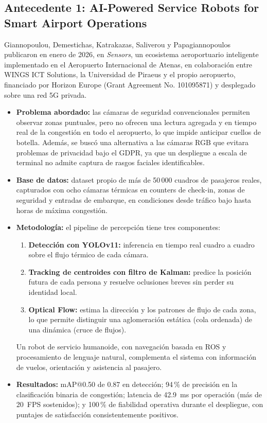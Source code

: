 \documentclass[12pt,letterpaper]{article}
\begin{document}
\subsection{Antecedente 1: AI-Powered Service Robots for Smart Airport Operations~\cite{giannopoulou2026}}

Giannopoulou, Demestichas, Katrakazas, Saliverou y Papagiannopoulos
publicaron en enero de 2026, en \textit{Sensors}, un ecosistema
aeroportuario inteligente implementado en el Aeropuerto Internacional de
Atenas, en colaboración entre WINGS ICT Solutions, la Universidad de
Piraeus y el propio aeropuerto, financiado por Horizon Europe (Grant
Agreement No. 101095871) y desplegado sobre una red 5G privada.

\begin{itemize}
    \item \textbf{Problema abordado:} las cámaras de seguridad
    convencionales permiten observar zonas puntuales, pero no ofrecen una
    lectura agregada y en tiempo real de la congestión en todo el
    aeropuerto, lo que impide anticipar cuellos de botella. Además, se
    buscó una alternativa a las cámaras RGB que evitara problemas de
    privacidad bajo el GDPR, ya que un despliegue a escala de terminal no
    admite captura de rasgos faciales identificables.

    \item \textbf{Base de datos:} dataset propio de más de 50\,000
    cuadros de pasajeros reales, capturados con ocho cámaras térmicas en
    counters de check-in, zonas de seguridad y entradas de embarque, en
    condiciones desde tráfico bajo hasta horas de máxima congestión.

    \item \textbf{Metodología:} el pipeline de percepción tiene tres
    componentes:
    \begin{enumerate}
        \item \textbf{Detección con YOLOv11:} inferencia en tiempo real
        cuadro a cuadro sobre el flujo térmico de cada cámara.
        \item \textbf{Tracking de centroides con filtro de Kalman:}
        predice la posición futura de cada persona y resuelve oclusiones
        breves sin perder su identidad local.
        \item \textbf{Optical Flow:} estima la dirección y los patrones de
        flujo de cada zona, lo que permite distinguir una aglomeración
        estática (cola ordenada) de una dinámica (cruce de flujos).
    \end{enumerate}
    Un robot de servicio humanoide, con navegación basada en ROS y
    procesamiento de lenguaje natural, complementa el sistema con
    información de vuelos, orientación y asistencia al pasajero.

    \item \textbf{Resultados:} mAP@0.50 de 0.87 en detección; 94\,\% de
    precisión en la clasificación binaria de congestión; latencia de
    42.9~ms por operación (más de 20~FPS sostenidos); y 100\,\% de
    fiabilidad operativa durante el despliegue, con puntajes de
    satisfacción consistentemente positivos.
\end{itemize}
\end{document}
